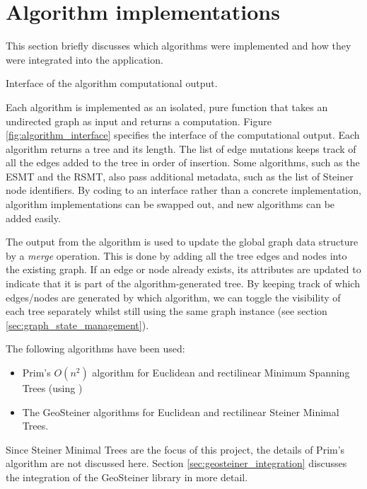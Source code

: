 \documentclass{l4proj}
\begin{document}
\section{Algorithm implementations}
\label{sec:algorithm_implementations}
This section briefly discusses which algorithms were implemented and how they were integrated into the application.
\begin{wrapstuff}[r,width=0.3\textwidth,type=figure]
    \centering
    \caption{Interface of the algorithm computational output.}
    
    \label{fig:algorithm_interface}
\end{wrapstuff}
Each algorithm is implemented as an isolated, pure function that takes an undirected graph as input and returns a computation.
Figure \ref{fig:algorithm_interface} specifies the interface of the computational output. Each algorithm returns a tree and its length. The list of edge mutations keeps track of all the edges added to the tree in order of insertion. Some algorithms, such as the ESMT and the RSMT, also pass additional metadata, such as the list of Steiner node identifiers.
By coding to an interface rather than a concrete implementation, algorithm implementations can be swapped out, and new algorithms can be added easily.

The output from the algorithm is used to update the global graph data structure by a \textit{merge} operation. This is done by adding all the tree edges and nodes into the existing graph. If an edge or node already exists, its attributes are updated to indicate that it is part of the algorithm-generated tree. By keeping track of which edges/nodes are generated by which algorithm, we can toggle the visibility of each tree separately whilst still using the same graph instance (see section \ref{sec:graph_state_management}).

\wrapstuffclear

The following algorithms have been used:
\begin{itemize}
    \item Prim's $O(n^2)$ algorithm for Euclidean and rectilinear Minimum Spanning Trees (using \citep[pp. 194--195]{Skiena2008})
    \item The GeoSteiner algorithms for Euclidean and rectilinear Steiner Minimal Trees.
\end{itemize}

Since Steiner Minimal Trees are the focus of this project, the details of Prim's algorithm are not discussed here. Section \ref{sec:geosteiner_integration} discusses the integration of the GeoSteiner library in more detail.
\end{document}
